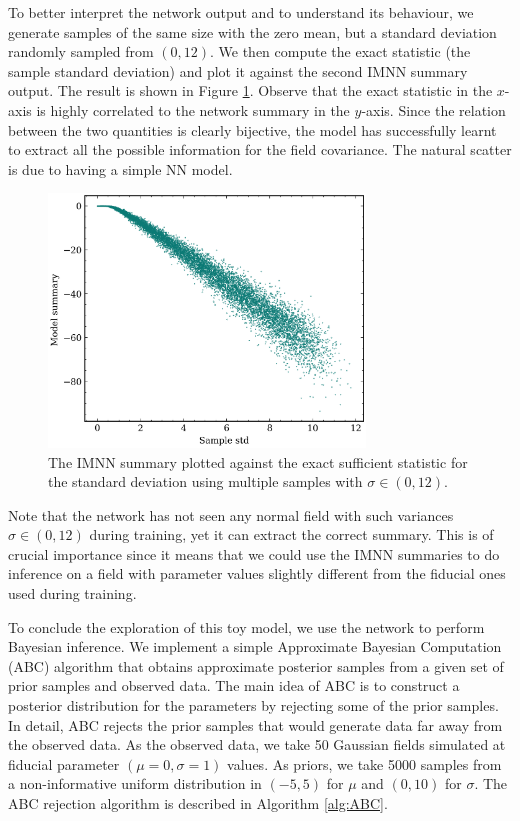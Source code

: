 To better interpret the network output and to understand its behaviour, we generate samples of the same size with the zero mean, but a standard deviation randomly sampled from $(0,12)$. We then compute the exact statistic (the sample standard deviation) and plot it against the second IMNN summary output. The result is shown in Figure \ref{fig:IMNN normal std}. Observe that the exact statistic in the $x$-axis is highly correlated to the network summary in the $y$-axis. Since the relation between the two quantities is clearly bijective, the model has successfully learnt to extract all the possible information for the field covariance. The natural scatter is due to having a simple NN model.

\begin{figure}[h!]
    \centering
    \includegraphics[width=0.75\textwidth]{img/ML/std_vs_model.png}
    \caption{The IMNN summary plotted against the exact sufficient statistic for the standard deviation using multiple samples with $\sigma \in (0,12)$.}
    \label{fig:IMNN normal std}
\end{figure}
Note that the network has not seen any normal field with such variances $\sigma \in (0,12)$ during training, yet it can extract the correct summary. This is of crucial importance since it means that we could use the IMNN summaries to do inference on a field with parameter values slightly different from the fiducial ones used during training.


To conclude the exploration of this toy model, we use the network to perform Bayesian inference. We implement a simple Approximate Bayesian Computation (ABC) \cite{review_ABC} algorithm that obtains approximate posterior samples from a given set of prior samples and observed data. The main idea of ABC is to construct a posterior distribution for the parameters by rejecting some of the prior samples. In detail, ABC rejects the prior samples that would generate data far away from the observed data. As the observed data, we take 50 Gaussian fields simulated at fiducial parameter $(\mu=0, \sigma=1)$ values. As priors, we take 5000 samples from a non-informative uniform distribution in $(-5, 5)$ for $\mu$ and $(0, 10)$ for $\sigma$. The ABC rejection algorithm is described in Algorithm \ref{alg:ABC}.


